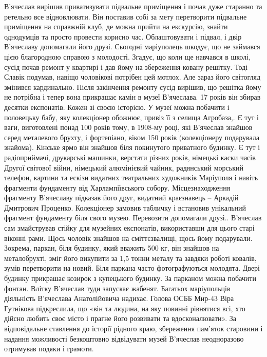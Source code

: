 \begin{multicols}{2}
В'ячеслав вирішив приватизувати підвальне приміщення і почав дуже старанно та
ретельно все відновлювати. Він поставив собі за мету перетворити підвальне
приміщення на справжній клуб, де можна прийти на екскурсію, знайти однодумців
та просто провести корисно час. Облаштовувати і підвал, і двір В'ячеславу
допомагали його друзі. Сьогодні маріуполець шкодує, що не займався цією
благородною справою з молодості. Згадує, що коли ще навчався в школі, сусід
почав ремонт у квартирі і дав йому на збереження ковану решітку. Тоді Славік
подумав, навіщо чоловікові потрібен цей мотлох. Але зараз його світогляд
змінився кардинально. Після закінчення ремонту сусід вирішив, що решітка йому
не потрібна і тепер вона прикрашає камін в музеї В'ячеслава. 17 років він
збирав десятки експонатів. Кожен зі своєю історією. У музеї можна побачити і
половецьку бабу, яку колекціонер обожнює, привіз її з селища Агробаза,. Є тут і
ваги, виготовлені понад 100 років тому, в 1908-му році, які В'ячеслав знайшов
серед металевого брухту, і фортепіано, віком 150 років (колекціонеру подарувала
знайома). Кінське ярмо він знайшов біля покинутого приватного будинку. Є тут і
радіоприймачі, друкарські машинки, верстати різних років, німецькі каски часів
Другої світової війни, німецький алюмінієвий чайник, радянський морський
телефон, картини та ескізи видатних театральних художників Маріуполя і навіть
фрагменти фундаменту від Харлампіївського собору. Місцезнаходження фрагменту
В'ячеславу підказав його друг, видатний краєзнавець – Аркадій Дмитрович
Проценко.  Колекціонер замовив табличку і встановив унікальний фрагмент
фундаменту біля свого музею. Перевозити допомагали друзі.. В'ячеслав сам
змайстрував стійку для музейних експонатів, використавши для цього старі
віконні рами. Щось чоловік знайшов на сміттєзвалищі, щось йому подарували.
Зокрема, паркан, біля будинку, який вважить 500 кг, він знайшов на
металобрухті, зміг його викупити за 1,5 тонни металу та завдяки роботі ковалів,
зумів перетворити на новий. Біля паркана часто фотографуються молодята. Двері
будинку прикрашає козирок з купецького будинку. За парканом можна побачити
фонтан. Влітку В'ячеслав туди запускає жабенят. Багатьох маріупольців
діяльність В'ячеслава Анатолійовича надихає. Голова ОСББ Мир-43 Віра Гутнікова
підкреслила, що «він та людина, на яку повинні рівнятися всі, хто дійсно любить
своє місто і прагне його розвивати та вдосконалювати». За відповідальне
ставлення до історії рідного краю, збереження пам'яток старовини і надання
можливості безкоштовно відвідувати музей В'ячеслав  неодноразово отримував
подяки і грамоти. 


\end{multicols}
